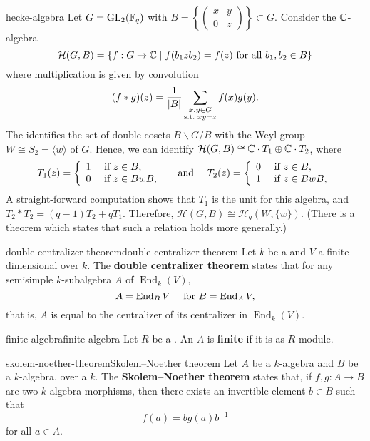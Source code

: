 \begin{example}{hecke-algebra}
    Let $G = \operatorname{GL}_2(\mathbb{F}_q)$ with  $B = \left\{ \left( \begin{smallmatrix} x & y \\ 0 & z \end{smallmatrix} \right) \right\} \subset G$. Consider the $\mathbb{C}$-algebra
    \[ \mathcal{H}(G, B) = \{ f : G \to \mathbb{C} \mid f(b_1 z b_2) = f(z) \textup{ for all } b_1, b_2 \in B \} \]
    where multiplication is given by convolution
    \[ (f * g)(z) = \frac{1}{|B|} \sum_{\substack{x, y \in G \\ \textup{s.t.\ } xy = z}} f(x) g(y) . \]
    The  identifies the set of double cosets $B \backslash G / B$ with the Weyl group $W \cong S_2 = \langle w \rangle$ of $G$. Hence, we can identify $\mathcal{H}(G, B) \cong \mathbb{C} \cdot T_1 \oplus \mathbb{C} \cdot T_2$, where
    \[ T_1(z) = \left\{ \begin{array}{cl} 1 & \textup{ if } z \in B , \\ 0 & \textup{ if } z \in B w B , \end{array} \right. \quad \textup{ and } \quad T_2(z) = \left\{ \begin{array}{cl} 0 & \textup{ if } z \in B , \\ 1 & \textup{ if } z \in B w B , \end{array} \right. \]
    A straight-forward computation shows that $T_1$ is the unit for this algebra, and $T_2 * T_2 = (q - 1) T_2 + q T_1$. Therefore, $\mathcal{H}(G, B) \cong \mathcal{H}_q(W, \{ w \})$. (There is a theorem which states that such a relation holds more generally.)
\end{example}

\begin{topic}{double-centralizer-theorem}{double centralizer theorem}
    Let $k$ be a  and $V$ a finite-dimensional  over $k$. The \textbf{double centralizer theorem} states that for any semisimple $k$-subalgebra $A$ of $\operatorname{End}_k(V)$,
    \[ A = \operatorname{End}_B V \quad \textup{ for } B = \operatorname{End}_A V , \]
    that is, $A$ is equal to the centralizer of its centralizer in $\operatorname{End}_k(V)$.
\end{topic}

\begin{topic}{finite-algebra}{finite algebra}
    Let $R$ be a . An  $A$ is \textbf{finite} if it is  as $R$-module.
\end{topic}

\begin{topic}{skolem-noether-theorem}{Skolem--Noether theorem}
    Let $A$ be a  $k$-algebra and $B$ be a   $k$-algebra, over a  $k$. The \textbf{Skolem--Noether theorem} states that, if $f, g : A \to B$ are two $k$-algebra morphisms, then there exists an invertible element $b \in B$ such that
    \[ f(a) = b g(a) b^{-1} \]
    for all $a \in A$.
\end{topic}
